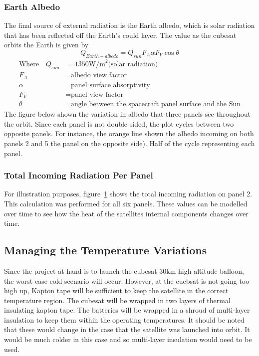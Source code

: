\subsubsection{Earth Albedo}
The final source of external radiation is the Earth albedo, which is solar radiation that has been reflected off the Earth's could layer. The value as the cubesat orbits the Earth is given by
\begin{equation}
Q_{Earth-albedo} = Q_{sun} F_A \alpha F_V \cos\theta
\end{equation}
\vspace{-1cm}
\begin{align}
\text{Where}\quad Q_{sun} &= 1350 \text{W/m}^2\text{(solar radiation)} \nonumber\\
F_A &= \text{albedo view factor} \nonumber\\
\alpha &= \text{panel surface absorptivity} \nonumber\\
F_V &= \text{panel view factor} \nonumber\\
\theta & = \text{angle between the spacecraft panel surface and the Sun}
\end{align}
The figure below shown the variation in albedo that three panels see throughout the orbit. Since each panel is not double sided, the plot cycles between two opposite panels. For instance, the orange line shown the albedo incoming on both panels 2 and 5 the panel on the opposite side). Half of the cycle representing each panel.
\begin{figure}[H]
\end{figure}

\subsubsection{Total Incoming Radiation Per Panel}
For illustration purposes, figure~\ref{fig:Qtotal2} shows the total incoming radiation on panel 2. This calculation was performed for all six panels. These values can be modelled over time to see how the heat of the satellites internal components changes over time.
\begin{figure}[H]
    \label{fig:Qtotal2}
\end{figure}

\subsection{Managing the Temperature Variations}
Since the project at hand is to launch the cubesat 30km high altitude balloon, the worst case cold scenario will occur. However, at the cuebsat is not going too high up, Kapton tape will be sufficient to keep the satellite in the correct temperature region. The cubesat will be wrapped in two layers of thermal insulating kapton tape. The batteries will be wrapped in a shroud of multi-layer insulation  to keep them within the operating temperatures. It should be noted that these would change in the case that the satellite was launched into orbit. It would be much colder in this case and so multi-layer insulation would need to be used. 


